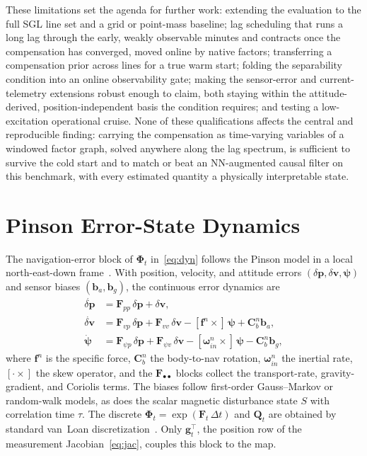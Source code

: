 \documentclass{IEEEtaes}
\begin{document}
These limitations set the agenda for further work: extending the evaluation to the
full SGL line set and a grid or point-mass baseline; lag scheduling that runs a long
lag through the early, weakly observable minutes and contracts once the compensation
has converged, moved online by native factors; transferring a compensation prior
across lines for a true warm start; folding the separability condition into an
online observability gate; making the sensor-error and current-telemetry extensions
robust enough to claim, both staying within the attitude-derived,
position-independent basis the condition requires; and testing a low-excitation
operational cruise. None of these qualifications affects the central and reproducible
finding: carrying the compensation as time-varying variables of a windowed factor
graph, solved anywhere along the lag spectrum, is sufficient to survive the cold
start and to match or beat an NN-augmented causal filter on this benchmark, with
every estimated quantity a physically interpretable state.

\appendices
\section{Pinson Error-State Dynamics}\label{app:pinson}
The navigation-error block of $\boldsymbol{\Phi}_t$ in~\eqref{eq:dyn} follows the
Pinson model in a local north-east-down frame~\cite{titterton2004,groves2013}. With
position, velocity, and attitude errors $(\delta\mathbf{p},\delta\mathbf{v},
\boldsymbol{\psi})$ and sensor biases $(\mathbf{b}_a,\mathbf{b}_g)$, the continuous
error dynamics are
\begin{equation}
\begin{aligned}
\dot{\delta\mathbf{p}}&=\mathbf{F}_{pp}\,\delta\mathbf{p}+\delta\mathbf{v},\\
\dot{\delta\mathbf{v}}&=\mathbf{F}_{vp}\,\delta\mathbf{p}
+\mathbf{F}_{vv}\,\delta\mathbf{v}
-[\mathbf{f}^n\times]\,\boldsymbol{\psi}+\mathbf{C}^n_b\mathbf{b}_a,\\
\dot{\boldsymbol{\psi}}&=\mathbf{F}_{\psi p}\,\delta\mathbf{p}
+\mathbf{F}_{\psi v}\,\delta\mathbf{v}
-[\boldsymbol{\omega}^n_{in}\times]\,\boldsymbol{\psi}-\mathbf{C}^n_b\mathbf{b}_g,
\end{aligned}
\label{eq:pinson}
\end{equation}
where $\mathbf{f}^n$ is the specific force, $\mathbf{C}^n_b$ the body-to-nav rotation,
$\boldsymbol{\omega}^n_{in}$ the inertial rate, $[\cdot\times]$ the skew operator, and
the $\mathbf{F}_{\bullet\bullet}$ blocks collect the transport-rate, gravity-gradient,
and Coriolis terms. The biases follow first-order Gauss--Markov or random-walk models,
as does the scalar magnetic disturbance state $S$ with correlation time $\tau$. The
discrete $\boldsymbol{\Phi}_t=\exp(\mathbf{F}_t\,\Delta t)$ and $\mathbf{Q}_t$ are
obtained by standard van~Loan discretization~\cite{farrell2008}. Only
$\mathbf{g}_t^{\top}$, the position row of the measurement Jacobian~\eqref{eq:jac},
couples this block to the map.
\end{document}

